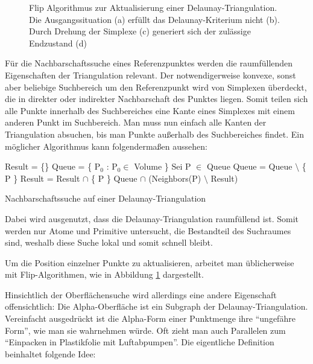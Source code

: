 \begin{figure}[bhpt]
  \centering
  \def\svgwidth{\textwidth}
  
  \caption[Delaunay-Triangulation: Flip Algorithmus]{Flip Algorithmus zur Aktualisierung einer Delaunay-Triangulation. Die Ausgangssituation (a) erfüllt das Delaunay-Kriterium nicht (b). Durch Drehung der Simplexe (c) generiert sich der zulässige Endzustand (d)}
  \label{fig:delaunay-flip}
\end{figure}


Für die Nachbarschaftssuche eines Referenzpunktes werden die raumfüllenden Eigenschaften der Triangulation relevant.
Der notwendigerweise konvexe, sonst aber beliebige Suchbereich um den Referenzpunkt wird von Simplexen überdeckt, die in direkter oder indirekter Nachbarschaft des Punktes liegen.
Somit teilen sich alle Punkte innerhalb des Suchbereiches eine Kante eines Simplexes mit einem anderen Punkt im Suchbereich.
Man muss nun einfach alle Kanten der Triangulation absuchen, bis man Punkte außerhalb des Suchbereiches findet.
Ein möglicher Algorithmus kann folgendermaßen aussehen:

\begin{algorithm}
  \centering
  \begin{algorithmic}
    \STATE Result = \{\}
    \STATE Queue = \{ P$_0$ : P$_0 \in$ Volume \}
    \STATE Sei P $\in$ Queue
    \STATE Queue = Queue $\setminus$ \{ P \}
    \STATE Result = Result $\cap$ \{ P \}
    \STATE Queue $\cap$ (Neighbors(P) $\setminus$ Result)
    \ENDIF
    \ENDWHILE
  \end{algorithmic}
  \caption[Nachbarschaftssuche auf einer Delaunay-Triangulation]{Nachbarschaftssuche auf einer Delaunay-Triangulation}
  \label{algo:delaunay-neighbors}
\end{algorithm}


Dabei wird ausgenutzt, dass die Delaunay-Triangulation raumfüllend ist.
Somit werden nur Atome und Primitive untersucht, die Bestandteil des Suchraumes sind, weshalb diese Suche lokal und somit schnell bleibt.

Um die Position einzelner Punkte zu aktualisieren, arbeitet man üblicherweise mit Flip-Algorithmen, wie in Abbildung \ref{fig:delaunay-flip} dargestellt.

Hinsichtlich der Oberflächensuche wird allerdings eine andere Eigenschaft offensichtlich:
Die Alpha-Oberfläche ist ein Subgraph der Delaunay-Triangulation.
Vereinfacht ausgedrückt ist die Alpha-Form einer Punktmenge ihre ``ungefähre Form'', wie man sie wahrnehmen würde.
Oft zieht man auch Parallelen zum ``Einpacken in Plastikfolie mit Luftabpumpen''.
Die eigentliche Definition beinhaltet folgende Idee:

